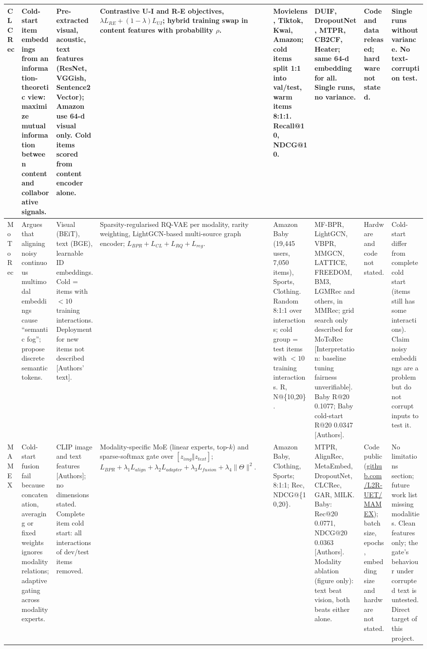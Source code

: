 \documentclass[conference]{IEEEtran}
\begin{document}
\begin{longtable}{@{}p{1.6cm}*{7}{>{\raggedright\arraybackslash}p{2.2cm}}@{}}
\midrule
CLCRec~\cite{wei2021clcrec} & Cold-start item embeddings from an information-theoretic view: maximize mutual information between content and collaborative signals. & Pre-extracted visual, acoustic, text features (ResNet, VGGish, Sentence2Vector); Amazon use 64-d visual only. Cold items scored from content encoder alone. & Contrastive U-I and R-E objectives, $\lambda L_{RE} + (1-\lambda) L_{UI}$; hybrid training swap in content features with probability $\rho$. & Movielens, Tiktok, Kwai, Amazon; cold items split 1:1 into val/test, warm items 8:1:1. Recall@10, NDCG@10. & DUIF, DropoutNet, MTPR, CB2CF, Heater; same 64-d embedding for all. Single runs, no variance. & Code and data released; hardware not stated. & Single runs without variance. No text-corruption test. \\
\midrule
MoToRec~\cite{liu2026motorec} & Argues that aligning noisy continuous multimodal embeddings cause ``semantic fog''; propose discrete semantic tokens. & Visual (BEiT), text (BGE), learnable ID embeddings. Cold = items with $<10$ training interactions. Deployment for new items not described [Authors' text]. & Sparsity-regularised RQ-VAE per modality, rarity weighting, LightGCN-based multi-source graph encoder; $L_{BPR}+L_{CL}+L_{RQ}+L_{reg}$. & Amazon Baby (19,445 users, 7,050 items), Sports, Clothing. Random 8:1:1 over interactions; cold group = test items with $<10$ training interactions. R, N@\{10,20\}. & MF-BPR, LightGCN, VBPR, MMGCN, LATTICE, FREEDOM, BM3, LGMRec and others, in MMRec; grid search only described for MoToRec [Interpretation: baseline tuning fairness unverifiable]. Baby R@20 0.1077; Baby cold-start R@20 0.0347 [Authors]. & Hardware and code not stated. & Cold-start differ from complete cold start (items still has some interactions). Claim noisy embeddings are a problem but do not corrupt inputs to test it. \\
\midrule
MAMEX~\cite{nguyen2025mamex} & Cold-start fusion fail because concatenation, averaging or fixed weights ignores modality relations; adaptive gating across modality experts. & CLIP image and text features [Authors]; no dimensions stated. Complete item cold start: all interactions of dev/test items removed. & Modality-specific MoE (linear experts, top-$k$) and sparse-softmax gate over $[z_{img}\Vert z_{text}]$; $L_{BPR}+\lambda_1 L_{align}+\lambda_2 L_{adapter}+\lambda_3 L_{fusion}+\lambda_4\lVert\Theta\rVert^2$. & Amazon Baby, Clothing, Sports; 8:1:1; Rec, NDCG@\{10,20\}. & MTPR, AlignRec, MetaEmbed, DropoutNet, CLCRec, GAR, MILK. Baby: Rec@20 0.0771, NDCG@20 0.0363 [Authors]. Modality ablation (figure only): text beat vision, both beats either alone. & Code public (\url{github.com/L2R-UET/MAMEX}); batch size, epochs, embedding size and hardware not stated. & No limitations section; future work list missing modalities. Clean features only; the gate's behaviour under corrupted text is untested. Direct target of this project. \\

\end{longtable}
\end{document}
